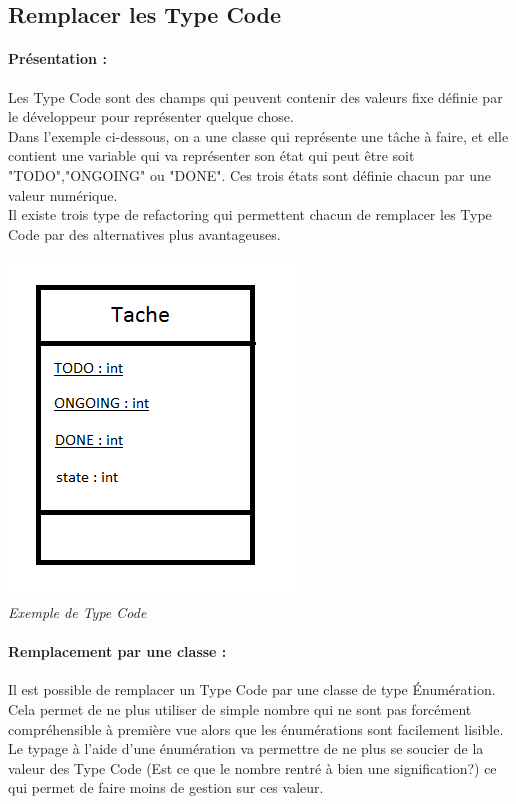 \documentclass[a4paper,twoside,12pt,openright]{report}
\begin{document}
\subsection{Remplacer les Type Code}
\paragraph{Présentation :}
Les Type Code sont des champs qui peuvent contenir des valeurs fixe définie par le développeur pour représenter quelque chose.\\
Dans l'exemple ci-dessous, on a une classe qui représente une tâche à faire, et elle contient une variable qui va représenter son état qui peut être soit "TODO","ONGOING" ou "DONE". Ces trois états sont définie chacun par une valeur numérique.\\
Il existe trois type de refactoring qui permettent chacun de remplacer les Type Code par des alternatives plus avantageuses.

\begin{center}
\includegraphics[scale=1]{Image/TypeCode.png}\\
\itshape{Exemple de Type Code}
\end{center}

\paragraph{Remplacement par une classe :}
Il est possible de remplacer un Type Code par une classe de type Énumération.\\
Cela permet de ne plus utiliser de simple nombre qui ne sont pas forcément compréhensible à première vue alors que les énumérations sont facilement lisible.\\
Le typage à l'aide d'une énumération va permettre de ne plus se soucier de la valeur des Type Code (Est ce que le nombre rentré à bien une signification?) ce qui permet de faire moins de gestion sur ces valeur.
\end{document}
